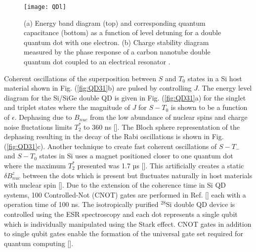 \begin{figure}[b]
\centering
\texttt{[image: QDl]}
\caption{\label{fig:QDl}(a) Energy band diagram (top) and corresponding quantum capacitance (bottom) as a function of level detuning  for a double quantum dot with one electron. (b) Charge stability diagram measured by the phase response of a carbon nanotube double quantum dot coupled to an electrical resonator \citep{Penfold-Fitch2017MicrowaveQubit}.}
\end{figure}

Coherent oscillations of the superposition between $S$ and $T_{0}$ states in a Si host material shown in Fig. (\ref{fig:QD31}b) are pulsed by controlling $J$. The energy level diagram for the Si/SiGe double QD is given in Fig. (\ref{fig:QD31}a) for the singlet and triplet states where the magnitude of $J$ for $S-T_{0}$ is shown to be a function of $\epsilon$. Dephasing due to $B_{nuc}$ from the low abundance of nuclear spins and charge noise fluctations limits $T_2^{*}$ to 360 ns []. The Bloch sphere representation of the dephasing resulting in the decay of the Rabi oscillations is shown in Fig. (\ref{fig:QD31}c). Another technique to create fast coherent oscillations of $S-T_{-}$ and $S-T_{0}$ states in Si uses a magnet positioned closer to one quantum dot where the maximum $T_{2}^{*}$ presented was 1.7 µs []. This artificially creates a static $\delta B^{z}_{nuc}$ between the dots which is present but fluctuates naturally in host materials with nuclear spin []. Due to the extension of the coherence time in Si QD systems, 100 Controlled-Not (CNOT) gates are performed in Ref. [] each with a operation time of 100 ns. The isotropically purified $^{28}$Si double QD device is controlled using the ESR spectroscopy and each dot represents a single qubit which is individually manipulated using the Stark effect. CNOT gates in addition to single qubit gates enable the formation of the universal gate set required for quantum computing []. 



